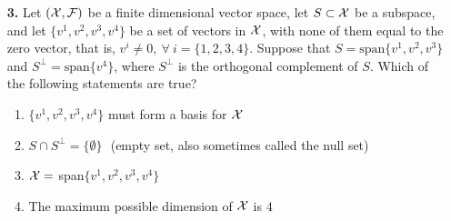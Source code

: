 \documentclass[letterpaper]{article}
\newcommand{\real}{\mathbb R}  %
\newcommand{\spanof}[1]{\textrm{span} \{ #1 \}}
\begin{document}
\begin{enumerate}
\begin{enumerate}
\item Let $A$ and $B$ be subsets of some vector space $({\cal X}, {\cal F})$ . \texttt{Statement:}   $\forall~x\in A$, $\exists~y \in B$   such that $x+y=0$.  \texttt{Negation:} For some $x\in A$,  there does not exist $y\in B$,  such that $x+y=0$.


 \item \texttt{Statement:} For every  $x\in \real$ and $\epsilon>0$, there is some pair of integers $n$ and $m$ such that $m\neq0$ and $|\frac{n}{m} -x| < \epsilon$.  \texttt{Negation:} $\forall x \in \real$ and $\forall \epsilon>0$, $\exists$ $n \in {\mathbb Z}$ and $0\neq m \in {\mathbb Z}$ such that $|\frac{n}{m} -x| \ge \epsilon$.


\item \texttt{Statement:} For every  $x\in \real$ and $\epsilon>0$, there is some pair of integers $n$ and $m$ such that $m\neq0$ and $|\frac{n}{m} -x| < \epsilon$.  \texttt{Negation:} $\forall \epsilon>0$,  $\exists x \in \real$  such that $\exists$ $n \in {\mathbb Z}$ and $0\neq m \in {\mathbb Z}$ such that $|\frac{n}{m} -x| \ge \epsilon$.

\end{enumerate}


\newpage

\begin{center}
\vspace*{6cm}

{\bf \LARGE Page Intentionally Left Blank}\\
\textbf{Anything written here will not be graded.}
\vspace*{3cm}
\textbf{You can use as scratch paper.}\\

\end{center}


\newpage

\item[{\bf 3.}]  Let $({\cal X}, {\cal F})$ be a finite dimensional vector space, let $S \subset {\cal X}$ be a subspace, and let $\{v^1, v^2, v^3, v^4\}$ be a set of vectors in $\cal X$, with none of them equal to the zero vector, that is, $ v^i \neq 0,~ \forall~ i=\{1,2,3,4\}$. Suppose that $S=\spanof{v^1,v^2,v^3}$ and $S^\perp=\spanof{v^4}$, where $S^\perp$ is the orthogonal complement of $S$. Which of the following statements are true?
\begin{enumerate}
	\setlength{\itemsep}{.15in}
	\renewcommand{\labelenumi}{(\alph{enumi})}
	\setlength{\itemsep}{.1in}
	\item $\{v^1, v^2, v^3, v^4\}$ must form a basis for $\cal X$
	\item $S \cap S^\perp = \{ \emptyset \} ~~~$(empty set, also sometimes called the null set)
	\item $\cal X=$ span$\{v^1,v^2,v^3,v^4\}$
	\item The maximum possible dimension of $\cal X$ is $4$
\end{enumerate}


\end{enumerate}
\end{document}
